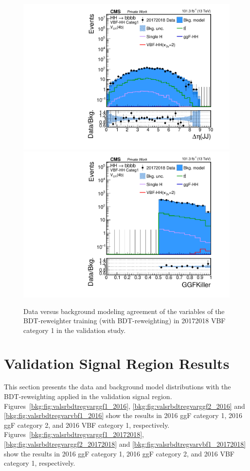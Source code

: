 \begin{figure}[htbp!]
\begin{center}
\includegraphics[width=0.24\linewidth]{Figures/Modeling/background/plotsDatadrivenWithBDT/20172018/VBFcateg1_CR_210/Histogram/plot20172018_j1j2_deltaEta_Btag4_VBFcateg1_CR_210_Histogram_log.pdf}
\includegraphics[width=0.24\linewidth]{Figures/Modeling/background/plotsDatadrivenWithBDT/20172018/VBFcateg1_CR_210/Histogram/plot20172018_GGFKiller_Btag4_VBFcateg1_CR_210_Histogram_log.pdf}
\end{center}
\caption{Data versus background modeling agreement of the variables of the BDT-reweighter training (with BDT-reweighting) in 20172018 VBF category 1 in the validation study.}
\label{bkg:fig:valbdtregvarvbf1_20172018}
\end{figure}

\clearpage

\section{Validation Signal Region Results}

This section presents the data and background model distributions with the BDT-reweighting applied in the validation signal region. Figures~\ref{bkg:fig:valsrbdtregvarggf1_2016}, \ref{bkg:fig:valsrbdtregvarggf2_2016} and \ref{bkg:fig:valsrbdtregvarvbf1_2016} show the results in 2016 ggF category 1, 2016 ggF category 2, and 2016 VBF category 1, respectively. Figures~\ref{bkg:fig:valsrbdtregvarggf1_20172018}, \ref{bkg:fig:valsrbdtregvarggf2_20172018} and \ref{bkg:fig:valsrbdtregvarvbf1_20172018} show the results in 2016 ggF category 1, 2016 ggF category 2, and 2016 VBF category 1, respectively.

